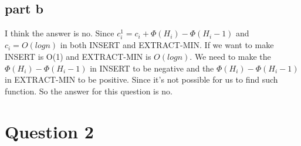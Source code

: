 \documentclass[paper=a4, fontsize=11pt]{scrartcl} %
\numberwithin{equation}{section} %
\numberwithin{figure}{section} %
\numberwithin{table}{section} %
\begin{document}
\subsection{\textbf{part b}}
I think the answer is no. Since $c_i^1 =c_i+\Phi(H_i)-\Phi(H_i-1)$ and $c_i=O(logn)$ in both INSERT and EXTRACT-MIN. If we want to make INSERT is O(1) and  EXTRACT-MIN is $O(logn)$.  We need to make the $\Phi(H_i)-\Phi(H_i-1)$ in INSERT to be negative and the $\Phi(H_i)-\Phi(H_i-1)$ in EXTRACT-MIN to be positive. Since it's not possible for us to find such function. So the answer for this question is no.

\vspace{2cm}
\section{\textbf{Question 2}}
\end{document}
